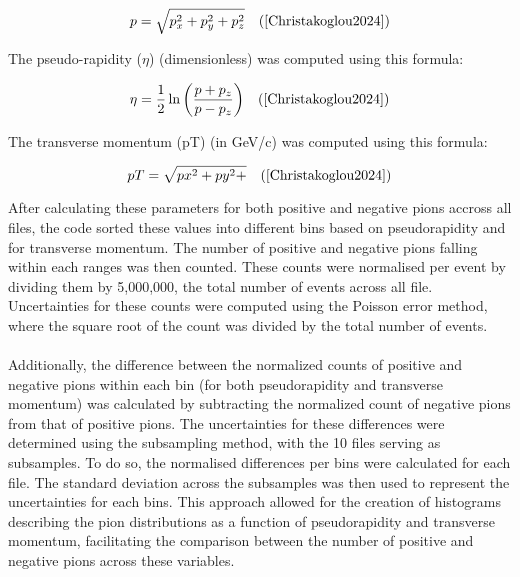 \[p = \sqrt{p_x^2 + p_y^2 + p_z^2} \quad \text{(\cite{Christakoglou2024})}\]

The pseudo-rapidity ($\eta$) (dimensionless) was computed using this formula:

\[\eta = \frac{1}{2} \ln{\left( \frac{p + p_z}{p - p_z} \right)}\quad \text{(\cite{Christakoglou2024})}\]

The transverse momentum (pT) (in GeV/c) was computed using this formula:

\[pT=\sqrt{px^2+py^2+}\quad \text{(\cite{Christakoglou2024})}\]


After calculating these parameters for both positive and negative pions accross all files, the code sorted these values into different bins based on pseudorapidity and for transverse momentum. The number of positive and negative pions falling within each ranges was then counted. These counts were normalised per event by dividing them by 5,000,000, the total number of events across all file. Uncertainties for these counts were computed using the Poisson error method, where the square root of the count was divided by the total number of events.
\\
\\
Additionally, the difference between the normalized counts of positive and negative pions within each bin (for both pseudorapidity and transverse momentum) was calculated by subtracting the normalized count of negative pions from that of positive pions. The uncertainties for these differences were determined using the subsampling method, with the 10 files serving as subsamples. To do so, the normalised differences per bins were calculated for each file. The standard deviation across the subsamples was then used to represent the uncertainties for each bins. This approach allowed for the creation of histograms describing the pion distributions as a function of pseudorapidity and transverse momentum, facilitating the comparison between the number of positive and negative pions across these variables. 
\\
